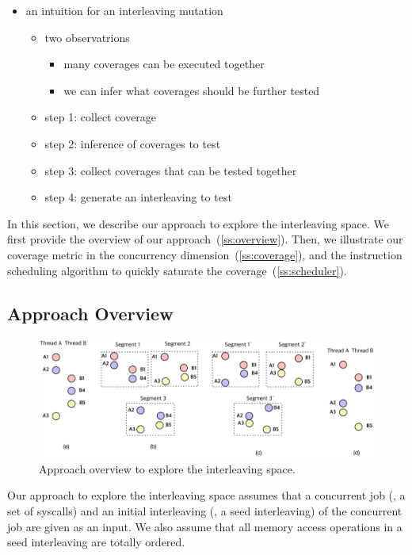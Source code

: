 {\begin{itemize}
\item an intuition for an interleaving mutation
  \begin{itemize}
  \item two observatrions
    \begin{itemize}
      \item many coverages can be executed together
      \item we can infer what coverages should be further tested
      \end{itemize}
  \item step 1: collect coverage
  \item step 2: inference of coverages to test
  \item step 3: collect coverages that can be tested together
  \item step 4: generate an interleaving to test
  \end{itemize}
\end{itemize}
}


In this section, we describe our approach to explore the interleaving
space.
%
We first provide the overview of our
approach~(\autoref{ss:overview}). Then, we illustrate our coverage
metric in the concurrency dimension~(\autoref{ss:coverage}), and the
instruction scheduling algorithm to quickly saturate the
coverage~(\autoref{ss:scheduler}).

\subsection{Approach Overview}
\label{ss:overview}

\begin{figure}[ht]
  \includegraphics[width=0.9\linewidth]{fig/intuition.pdf}
  \caption{Approach overview to explore the interleaving
    space. }
  \label{fig:overview}
\end{figure}

Our approach to explore the interleaving space assumes that a
concurrent job (\eg, a set of syscalls) and an initial interleaving
(\ie, a seed interleaving) of the concurrent job are given as an
input. We also assume that all memory access operations in a seed
interleaving are totally ordered.

